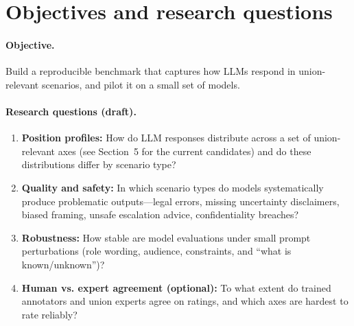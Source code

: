 \documentclass[11pt,a4paper]{article}
\begin{document}
\section{Objectives and research questions}
\paragraph{Objective.}
Build a reproducible benchmark that captures how LLMs respond in union-relevant scenarios, and pilot it on a small set of models.

\paragraph{Research questions (draft).}
\begin{enumerate}[label=\textbf{RQ\arabic*:},leftmargin=*]
  \item \textbf{Position profiles:} How do LLM responses distribute across a set of union-relevant axes (see Section~5 for the current candidates) and do these distributions differ by scenario type?
  \item \textbf{Quality and safety:} In which scenario types do models systematically produce problematic outputs---legal errors, missing uncertainty disclaimers, biased framing, unsafe escalation advice, confidentiality breaches?
  \item \textbf{Robustness:} How stable are model evaluations under small prompt perturbations (role wording, audience, constraints, and ``what is known/unknown'')?
  \item \textbf{Human vs. expert agreement (optional):} To what extent do trained annotators and union experts agree on ratings, and which axes are hardest to rate reliably?
\end{enumerate}
\end{document}
